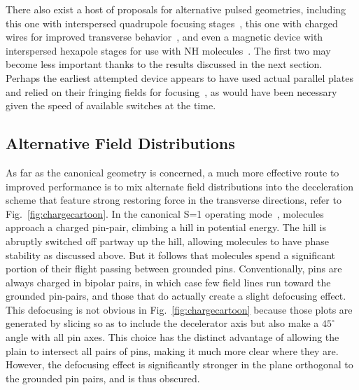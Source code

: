 There also exist a host of proposals for alternative pulsed geometries, including this one with interspersed quadrupole focusing stages~\cite{Sawyer2008a}, this one with charged wires for improved transverse behavior~\cite{Wang2016}, and even a magnetic device with interspersed hexapole stages for use with NH molecules~\cite{Plomp2019}. The first two may become less important thanks to the results discussed in the next section. Perhaps the earliest attempted device appears to have used actual parallel plates and relied on their fringing fields for focusing~\cite{Golub1967}, as would have been necessary given the speed of available switches at the time.

\subsection{Alternative Field Distributions}

As far as the canonical geometry is concerned, a much more effective route to improved performance is to mix alternate field distributions into the deceleration scheme that feature strong restoring force in the transverse directions, refer to Fig.~\ref{fig:chargecartoon}.
In the canonical S=1 operating mode~\cite{VanDeMeerakker2012}, molecules approach a charged pin-pair, climbing a hill in potential energy. 
The hill is abruptly switched off partway up the hill, allowing molecules to have phase stability as discussed above.
But it follows that molecules spend a significant portion of their flight passing between grounded pins.
Conventionally, pins are always charged in bipolar pairs, in which case few field lines run toward the grounded pin-pairs, and those that do actually create a slight defocusing effect.
This defocusing is not obvious in Fig.~\ref{fig:chargecartoon} because those plots are generated by slicing so as to include the decelerator axis but also make a $45^\circ$ angle with all pin axes.
This choice has the distinct advantage of allowing the plain to intersect all pairs of pins, making it much more clear where they are.
However, the defocusing effect is significantly stronger in the plane orthogonal to the grounded pin pairs, and is thus obscured.

